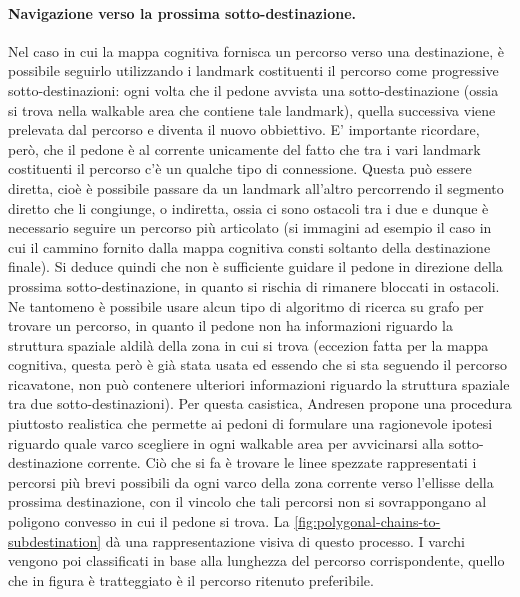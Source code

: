 \documentclass[12pt,a4paper,openright,oneside]{book}
\begin{document}
\paragraph{Navigazione verso la prossima sotto-destinazione.}\label{navigation-to-subdestination} Nel caso in cui la mappa cognitiva fornisca un percorso verso una destinazione, è possibile seguirlo utilizzando i landmark costituenti il percorso come progressive sotto-destinazioni: ogni volta che il pedone avvista una sotto-destinazione (ossia si trova nella walkable area che contiene tale landmark), quella successiva viene prelevata dal percorso e diventa il nuovo obbiettivo. E’ importante ricordare, però, che il pedone è al corrente unicamente del fatto che tra i vari landmark costituenti il percorso c’è un qualche tipo di connessione. Questa può essere diretta, cioè è possibile passare da un landmark all’altro percorrendo il segmento diretto che li congiunge, o indiretta, ossia ci sono ostacoli tra i due e dunque è necessario seguire un percorso più articolato (si immagini ad esempio il caso in cui il cammino fornito dalla mappa cognitiva consti soltanto della destinazione finale). Si deduce quindi che non è sufficiente guidare il pedone in direzione della prossima sotto-destinazione, in quanto si rischia di rimanere bloccati in ostacoli. Ne tantomeno è possibile usare alcun tipo di algoritmo di ricerca su grafo per trovare un percorso, in quanto il pedone non ha informazioni riguardo la struttura spaziale aldilà della zona in cui si trova (eccezion fatta per la mappa cognitiva, questa però è già stata usata ed essendo che si sta seguendo il percorso ricavatone, non può contenere ulteriori informazioni riguardo la struttura spaziale tra due sotto-destinazioni). Per questa casistica, Andresen \cite{Andresen2018} propone una procedura piuttosto realistica che permette ai pedoni di formulare una ragionevole ipotesi riguardo quale varco scegliere in ogni walkable area per avvicinarsi alla sotto-destinazione corrente. Ciò che si fa è trovare le linee spezzate rappresentati i percorsi più brevi possibili da ogni varco della zona corrente verso l’ellisse della prossima destinazione, con il vincolo che tali percorsi non si sovrappongano al poligono convesso in cui il pedone si trova. La \cref{fig:polygonal-chains-to-subdestination} dà una rappresentazione visiva di questo processo. I varchi vengono poi classificati in base alla lunghezza del percorso corrispondente, quello che in figura è tratteggiato è il percorso ritenuto preferibile.
\end{document}

